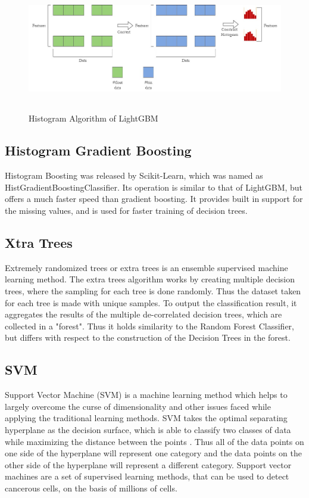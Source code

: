\begin{figure}[H]
\centering
\includegraphics[width=160mm,height=55mm]{figures/hgb_lgbm.jpg}
\caption{Histogram Algorithm of LightGBM}
\label{DLAccuracy}
\end{figure}

\subsection{Histogram Gradient Boosting}
Histogram Boosting was released by Scikit-Learn, which was named as HistGradientBoostingClassifier. Its operation is similar to that of LightGBM, but offers a much faster speed than gradient boosting. It provides built in support for the missing values, and is used for faster training of decision trees.  

\subsection{Xtra Trees}
Extremely randomized trees or extra trees is an ensemble supervised machine learning method. The extra trees algorithm works by creating multiple decision trees, where the sampling for each tree is done randomly. Thus the dataset taken for each tree is made with unique samples. To output the classification result, it aggregates the results of the multiple de-correlated decision trees, which are collected in a "forest". Thus it holds similarity to the Random Forest Classifier, but differs with respect to the construction of the Decision Trees in the forest.

\subsection{SVM}
Support Vector Machine (SVM) is a machine learning method which helps to largely overcome the curse of dimensionality and other issues faced while applying the traditional learning methods. SVM takes the optimal separating hyperplane as the decision surface, which is able to classify two classes of data while maximizing the distance between the points \cite{ar24}.  Thus all of the data points on one side of the hyperplane will represent one category and the data points on the other side of the hyperplane will represent a different category. Support vector machines are a set of supervised learning methods, that can be used to detect cancerous cells, on the basis of millions of cells.

